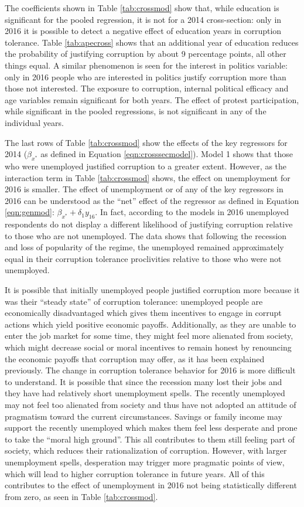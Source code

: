 \documentclass[12pt,a4]{article}\usepackage[]{graphicx}\usepackage[]{xcolor}
\begin{document}
The coefficients shown in Table \ref{tab:crossmod} show that, while education is significant for the pooled regression, it is not for a 2014 cross-section: only in 2016 it is possible to detect a negative effect of education years in corruption tolerance. Table \ref{tab:apecross} shows that an additional year of education reduces the probability of justifying corruption by about 9 percentage points, all other things equal. A similar phenomenon is seen for the interest in politics variable: only in 2016 people who are interested in politics justify corruption more than those not interested. The exposure to corruption, internal political efficacy and age variables remain significant for both years. The effect of protest participation, while significant in the pooled regressions, is not significant in any of the individual years. 

The last rows of Table \ref{tab:crossmod} show the effects of the key regressors for 2014 ($\beta_{x^*}$ as defined in Equation \ref{eqn:crosssecmodel}). Model 1 shows that those who were unemployed justified corruption to a greater extent. However, as the interaction term in Table \ref{tab:crossmod} shows, the effect on unemployment for 2016 is smaller. The effect of unemployment or of any of the key regressors in 2016 can be understood as the \enquote{net} effect of the regressor as defined in Equation \ref{eqn:genmod}: $\beta_{x^*} + \delta_1 y_{16}$. In fact, according to the models in 2016 unemployed respondents do not display a different likelihood of justifying corruption relative to those who are not unemployed. The data shows that following the recession and loss of popularity of the regime, the unemployed remained approximately equal in their corruption tolerance proclivities relative to those who were not unemployed.

It is possible that initially unemployed people justified corruption more because it was their “steady state” of corruption tolerance: unemployed people are economically disadvantaged which gives them incentives to engage in corrupt actions which yield positive economic payoffs. Additionally, as they are unable to enter the job market for some time, they might feel more alienated from society, which might decrease social or moral incentives to remain honest by renouncing the economic payoffs that corruption may offer, as it has been explained previously. The change in corruption tolerance behavior for 2016 is more difficult to understand. It is possible that since the recession many lost their jobs and they have had relatively short unemployment spells. The recently unemployed may not feel too alienated from society and thus have not adopted an attitude of pragmatism toward the current circumstances. Savings or family income may support the recently unemployed which makes them feel less desperate and prone to take the “moral high ground”. This
all contributes to them still feeling part of society, which reduces their rationalization of corruption. However, with larger unemployment spells, desperation may trigger more pragmatic points of view, which will lead to higher corruption tolerance in future years. All of this contributes to the effect of unemployment in 2016 not being statistically different from zero, as seen in Table \ref{tab:crossmod}.
\end{document}
